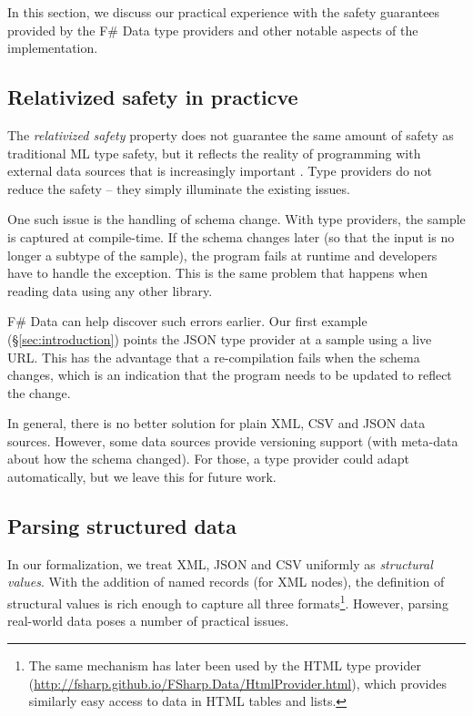 \documentclass[10pt,preprint,blind,clearpagebib]{sigplanconf}
\begin{document}
In this section, we discuss our practical experience with the safety guarantees provided by the
F\# Data type providers and other notable aspects of the implementation.


\subsection{Relativized safety in practicve}
\label{sec:safety-discuss}

The \emph{relativized safety} property does not guarantee the same amount of safety as traditional
ML type safety, but it reflects the reality of programming with external data sources that is 
increasingly important \cite{age-of-web}. Type providers do not reduce the safety -- they simply 
illuminate the existing issues.

One such issue is the handling of schema change. With type providers, the sample is captured 
at compile-time. If the schema changes later (so that the input is no longer a subtype of the 
sample), the program fails at runtime and developers have to handle the exception. This is the 
same problem that happens when reading data using any other library.

F\# Data can help discover such errors earlier. Our first example (\S\ref{sec:introduction})
points the JSON type provider at a sample using a live URL. This has the advantage that a re-compilation 
fails when the schema changes, which is an indication that the program needs to be updated to reflect the
change.

In general, there is no better solution for plain XML, CSV and JSON data sources. However, some data 
sources provide versioning support (with meta-data about how the schema changed). For those, a type 
provider could adapt automatically, but we leave this for future work.


\subsection{Parsing structured data}
\label{sec:impl-parsing}

In our formalization, we treat XML, JSON and CSV uniformly as \emph{structural values}. With the addition of 
named records (for XML nodes), the definition of structural values is rich enough to capture all 
three formats\footnote{The same mechanism has later been used by the HTML type provider 
(\url{http://fsharp.github.io/FSharp.Data/HtmlProvider.html}), which provides similarly easy 
access to data in HTML tables and lists.}. However, parsing real-world data poses a number of practical issues.
\end{document}
